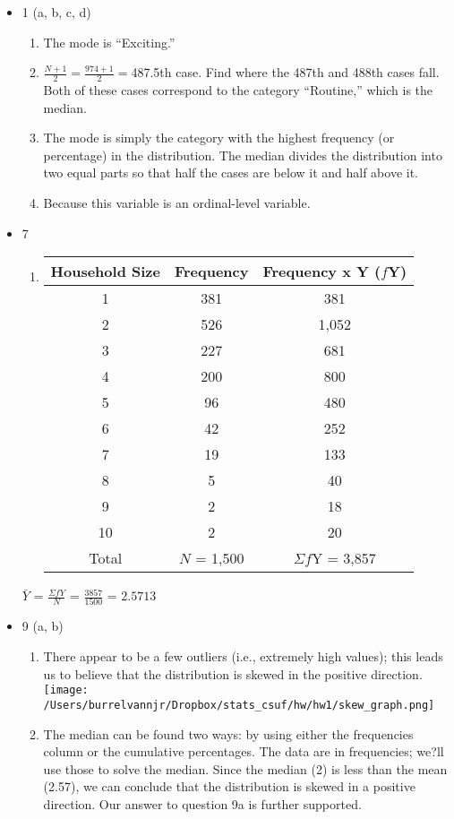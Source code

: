 \documentclass{article}
\begin{document}
\begin{itemize}
\item 1 (a, b, c, d) 
	\begin{enumerate}[label=(\alph*)]
	\item The mode is ``Exciting.''
	\item $\frac{N + 1}{2} = \frac{974 + 1}{2} = $487.5th case. Find where the 487th and 488th cases fall. Both of these cases correspond to the category ``Routine,'' which is the median.
	\item The mode is simply the category with the highest frequency (or percentage) in the distribution. The median divides the distribution into two equal parts so that half the cases are below it and half above it.
	\item Because this variable is an ordinal-level variable.
	\end{enumerate}
\item 7 
	\begin{enumerate}[label=(\alph*)]
	\item \begin{tabular}{ | c | c | c | }
	\hline
    	Household Size & Frequency & Frequency x Y ($f$Y) \\ \hline
	1 & 381 & 381 \\ \hline
	2 & 526 & 1,052 \\ \hline
	3 & 227 & 681 \\ \hline
	4 & 200 & 800 \\ \hline
	5 & 96 & 480 \\ \hline
	6 & 42 & 252 \\ \hline
	7 & 19 & 133 \\ \hline
	8 & 5 & 40 \\ \hline
	9 & 2 & 18 \\ \hline
	10 & 2 & 20 \\ \hline
	Total & $N$ = 1,500 & $\Sigma f$Y = 3,857 \\ 
	\hline
	\end{tabular}
	\end{enumerate}
	$\bar{Y}$ = $\frac{\Sigma fY}{N}$ = $\frac{3857}{1500}$ = $2.5713$ \\
\item 9 (a, b) 
	\begin{enumerate}[label=(\alph*)]
	\item There appear to be a few outliers (i.e., extremely high values); this leads us to believe that the distribution is skewed in the positive direction. \\ \texttt{[image: /Users/burrelvannjr/Dropbox/stats\_csuf/hw/hw1/skew\_graph.png]}
	\item The median can be found two ways: by using either the frequencies column or the cumulative percentages. The data are in frequencies; we?ll use those to solve the median. Since the median (2) is less than the mean (2.57), we can conclude that the distribution is skewed in a positive direction. Our answer to question 9a is further supported.
	\end{enumerate}
\end{itemize}
\end{document}

